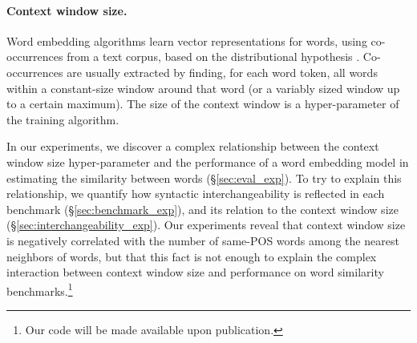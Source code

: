 \documentclass[11pt,a4paper]{article}
\begin{document}
    \paragraph{Context window size.}
    Word embedding algorithms learn vector representations for words,
    using co-occurrences from a text corpus,
    based on the distributional hypothesis \cite{harris1954distributional}.
    Co-occurrences are usually extracted by finding, for each word token, all
    words within a constant-size window around that word (or a variably sized
    window up to a certain maximum).
    The size of the context window is a hyper-parameter of the training algorithm.

    In our experiments,
    we discover a complex relationship between the context window size hyper-parameter
    and the performance of a word embedding model in estimating the similarity between words
    (\S\ref{sec:eval_exp}).
    To try to explain this relationship, we quantify how syntactic interchangeability
    is reflected in each benchmark (\S\ref{sec:benchmark_exp}),
    and its relation to the context window size (\S\ref{sec:interchangeability_exp}).
    Our experiments reveal that context window size is negatively correlated
    with the number of same-POS words among the nearest neighbors of words,
    but that this fact is not enough to explain the complex interaction between
    context window size and performance on word similarity
    benchmarks.\footnote{Our code will be made available upon publication.}
    
\end{document}
